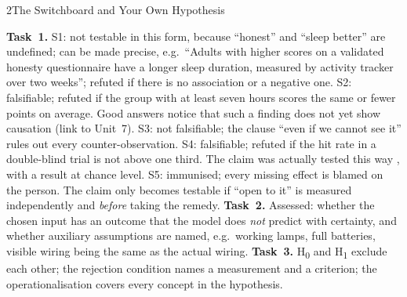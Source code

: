 \begin{uebungsblattb}{2}{The Switchboard and Your Own Hypothesis}
\begin{lehrhinweis}
\textbf{Task~1.} S1: not testable in this form, because \enquote{honest}
and \enquote{sleep better} are undefined; can be made precise, e.g.\
\enquote{Adults with higher scores on a validated honesty questionnaire
have a longer sleep duration, measured by activity tracker over two
weeks}; refuted if there is no association or a negative one. S2:
falsifiable; refuted if the group with at least seven hours scores the
same or fewer points on average. Good answers notice that such a finding
does not yet show causation (link to Unit~7). S3: not falsifiable; the
clause \enquote{even if we cannot see it} rules out every
counter-observation. S4: falsifiable; refuted if the hit rate in a
double-blind trial is not above one third. The claim was actually tested
this way \parencite{carlson1985doubleblind}, with a result at chance
level. S5: immunised; every missing effect is blamed on the person. The
claim only becomes testable if \enquote{open to it} is measured
independently and \emph{before} taking the remedy.
\textbf{Task~2.} Assessed: whether the chosen input has an outcome that
the model does \emph{not} predict with certainty, and whether auxiliary
assumptions are named, e.g.\ working lamps, full batteries, visible wiring
being the same as the actual wiring.
\textbf{Task~3.} H\textsubscript{0} and H\textsubscript{1} exclude each
other; the rejection condition names a measurement and a criterion; the
operationalisation covers every concept in the hypothesis.
\end{lehrhinweis}
\end{uebungsblattb}
